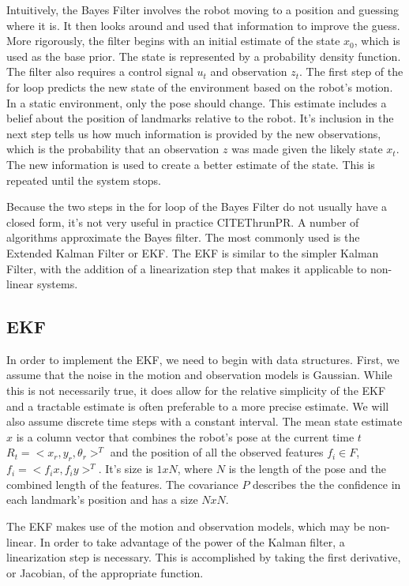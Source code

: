 \documentclass[12pt]{report}
\begin{document}
Intuitively, the Bayes Filter involves the robot moving to a position and guessing where it is.  It then looks around and used that information to improve the guess.  More rigorously, the filter begins with an initial estimate of the state $x_0$, which is used as the base prior.  The state is represented by a probability density function.  The filter also requires a control signal $u_t$ and observation $z_t$.  The first step of the for loop predicts the new state of the environment based on the robot's motion.  In a static environment, only the pose should change.  This estimate includes a belief about the position of landmarks relative to the robot.  It's inclusion in the next step tells us how much information is provided by the new observations, which is the probability that an observation $z$ was made given the likely state $x_t$.  The new information is used to create a better estimate of the state.  This is repeated until the system stops.  

Because the two steps in the for loop of the Bayes Filter do not usually have a closed form, it's not very useful in practice CITE{ThrunPR}.  A number of algorithms approximate the Bayes filter.  The most commonly used is the Extended Kalman Filter or EKF.  The EKF is similar to the simpler Kalman Filter, with the addition of a linearization step that makes it applicable to non-linear systems.  

\subsection{EKF}  
In order to implement the EKF, we need to begin with data structures.  First, we assume that the noise in the motion and observation models is Gaussian.  While this is not necessarily true, it does allow for the relative simplicity of the EKF and a tractable estimate is often preferable to a more precise estimate.  We will also assume discrete time steps with a constant interval.  The mean state estimate $x$ is a column vector that combines the robot's pose at the current time $t$ $R_t = <x_r, y_r, \theta_r>^T$ and the position of all the observed features $f_i \in F$, $f_i = <f_ix, f_iy>^T$.  It's size is $1xN$, where $N$ is the length of the pose and the combined length of the features.  The covariance $P$ describes the the confidence in each landmark's position and has a size $NxN$.

The EKF makes use of the motion and observation models, which may be non-linear.  In order to take advantage of the power of the Kalman filter, a linearization step is necessary.  This is accomplished by taking the first derivative, or Jacobian, of the appropriate function.  
\end{document}
